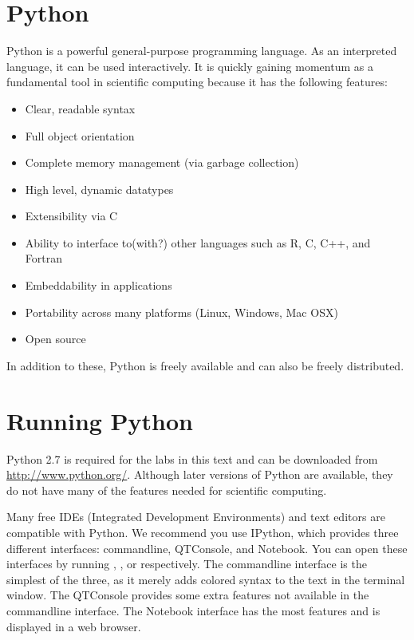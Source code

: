 \label{lab:Essential_Python}

\section*{Python}
Python is a powerful general-purpose programming language. As an interpreted
language, it can be used interactively. 
It is quickly gaining momentum as a fundamental tool in scientific computing because it has the following features:
\begin{itemize}
\item Clear, readable syntax
\item Full object orientation
\item Complete memory management (via garbage collection)
\item High level, dynamic datatypes
\item Extensibility via C
\item Ability to interface to(with?) other languages such as R, C, C++, and Fortran
\item Embeddability in applications
\item Portability across many platforms (Linux, Windows, Mac OSX)
\item Open source
\end{itemize}
In addition to these, Python is freely available and can also be freely distributed.

\section*{Running Python}
Python 2.7 is required for the labs in this text and can be downloaded from \url{http://www.python.org/}. Although later versions of 
Python are available, they do not have many of the features needed for scientific computing. 

Many free IDEs (Integrated Development Environments) and text editors are compatible with Python. We recommend you use IPython, which provides three different interfaces: commandline, QTConsole, and Notebook. You can open these interfaces by running , , or  respectively.
The commandline interface is the simplest of the three, as it merely adds colored syntax to the text in the terminal window.
The QTConsole provides some extra features not available in the commandline interface.
The Notebook interface has the most features and is displayed in a web browser.

